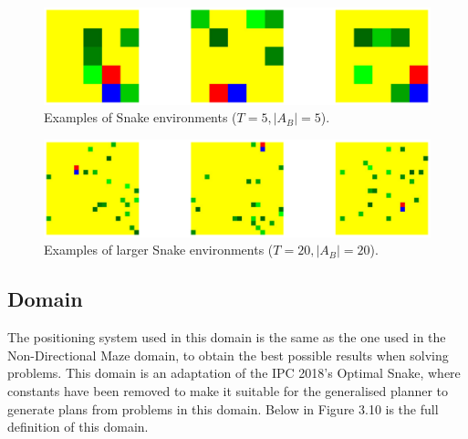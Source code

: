\begin{figure}[h!]
\centering
\includegraphics[width=\textwidth]{images/snake5x5autogen.png}
\caption{Examples of Snake environments ($T=5, |A_B|=5$).}
\end{figure}

\begin{figure}[h!]
\centering
\includegraphics[width=\textwidth]{images/snake20x20autogen.png}
\caption{Examples of larger Snake environments ($T=20, |A_B|=20$).}
\end{figure}

\newpage
\subsection{Domain}
The positioning system used in this domain is the same as the one used in the Non-Directional Maze domain, to obtain the best possible results when solving problems. This domain is an adaptation of the IPC 2018's Optimal Snake, where constants have been removed to make it suitable for the generalised planner to generate plans from problems in this domain. Below in Figure 3.10 is the full definition of this domain.

